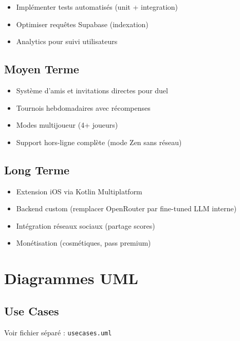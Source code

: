 \documentclass[12pt,a4paper,openany]{report}
\begin{document}
    \begin{itemize}
      \item Implémenter tests automatisés (unit + integration)
      \item Optimiser requêtes Supabase (indexation)
      \item Analytics pour suivi utilisateurs
    \end{itemize}

    \section{Moyen Terme}

    \begin{itemize}
      \item Système d'amis et invitations directes pour duel
      \item Tournois hebdomadaires avec récompenses
      \item Modes multijoueur (4+ joueurs)
      \item Support hors-ligne complète (mode Zen sans réseau)
    \end{itemize}

    \section{Long Terme}

    \begin{itemize}
      \item Extension iOS via Kotlin Multiplatform
      \item Backend custom (remplacer OpenRouter par fine-tuned LLM interne)
      \item Intégration réseaux sociaux (partage scores)
      \item Monétisation (cosmétiques, pass premium)
    \end{itemize}

    \appendix

    \chapter{Diagrammes UML}

    \section{Use Cases}

    Voir fichier séparé : \texttt{usecases.uml}
\end{document}
